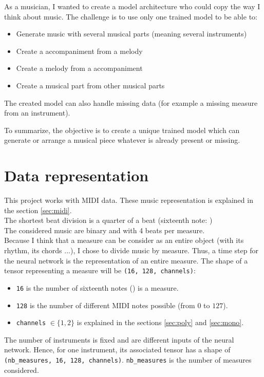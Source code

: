 \documentclass[12pt]{report}
\begin{document}
As a musician, I wanted to create a model architecture who could copy the way I think about music.
The challenge is to use only one trained model to be able to:
\begin{itemize}
    \item Generate music with several musical parts (meaning several instruments)
    \item Create a accompaniment from a melody
    \item Create a melody from a accompaniment
    \item Create a musical part from other musical parts
\end{itemize}
The created model can also handle missing data (for example a missing measure from an instrument).

To summarize, the objective is to create a unique trained model which can generate or arrange a musical piece whatever is already present or missing.

\section{Data representation}
\label{sec:data_represetation}

This project works with MIDI data. These music representation is explained in the section \ref{sec:midi}. \\
The shortest beat division is a quarter of a beat (sixteenth note: \musSixteenth) \\
The considered music are binary and with 4 beats per measure. \\
Because I think that a measure can be consider as an entire object (with its rhythm, its chords ...), I chose to divide music by measure. Thus, a time step for the neural network is the representation of an entire measure.
The shape of a tensor representing a measure will be \texttt{(16, 128, channels)}:
\begin{itemize}
    \item \texttt{16} is the number of sixteenth notes (\musSixteenth) is a measure.
    \item \texttt{128} is the number of different MIDI notes possible (from $0$ to $127$).
    \item \texttt{channels} $\in \{1, 2\}$ is explained in the sections \ref{sec:poly} and \ref{sec:mono}.
\end{itemize}

The number of instruments is fixed and are different inputs of the neural network.
Hence, for one instrument, its associated tensor has a shape of \texttt{(nb\_measures, 16, 128, channels)}. \texttt{nb\_measures} is the number of measures considered.
\end{document}
